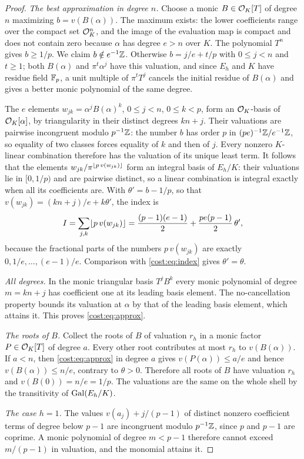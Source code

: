 \begin{proof}
\emph{The best approximation in degree $n$.} Choose a monic $B\in\mathcal{O}_K[T]$ of degree $n$
maximizing $b=v(B(\alpha))$. The maximum exists: the lower coefficients range over the
compact set $\mathcal{O}_K^n$, and the image of the evaluation map is compact and does not contain
zero because $\alpha$ has degree $e>n$ over $K$. The polynomial $T^n$ gives $b\ge1/p$. We
claim $b\notin e^{-1}\mathbb{Z}$. Otherwise $b=j/e+t/p$ with $0\le j<n$ and $t\ge1$; both
$B(\alpha)$ and $\pi^t\alpha^j$ have this valuation, and since $E_h$ and $K$ have residue
field $\mathbb{F}_p$, a unit multiple of $\pi^tT^j$ cancels the initial residue of $B(\alpha)$ and
gives a better monic polynomial of the same degree.

The $e$ elements $w_{jk}=\alpha^jB(\alpha)^k$, $0\le j<n$, $0\le k<p$, form an
$\mathcal{O}_K$-basis of $\mathcal{O}_K[\alpha]$, by triangularity in their distinct degrees $kn+j$. Their
valuations are pairwise incongruent modulo $p^{-1}\mathbb{Z}$: the number $b$ has order $p$ in
$(pe)^{-1}\mathbb{Z}/e^{-1}\mathbb{Z}$, so equality of two classes forces equality of $k$ and then of $j$.
Every nonzero $K$-linear combination therefore has the valuation of its unique least term.
It follows that the elements $w_{jk}/\pi^{\lfloor p\,v(w_{jk})\rfloor}$ form an integral basis of
$E_h/K$: their valuations lie in $[0,1/p)$ and are pairwise distinct, so a linear
combination is integral exactly when all its coefficients are. With $\theta'=b-1/p$, so
that $v(w_{jk})=(kn+j)/e+k\theta'$, the index is
\[
 I=\sum_{j,k}\lfloor p\,v(w_{jk})\rfloor=\frac{(p-1)(e-1)}2+\frac{pe(p-1)}2\,\theta',
\]
because the fractional parts of the numbers $p\,v(w_{jk})$ are exactly
$0,1/e,\ldots,(e-1)/e$. Comparison with \eqref{cost:eq:index} gives $\theta'=\theta$.

\emph{All degrees.} In the monic triangular basis $T^jB^k$ every monic polynomial of degree
$m=kn+j$ has coefficient one at its leading basis element. The no-cancellation property
bounds its valuation at $\alpha$ by that of the leading basis element, which attains it.
This proves \eqref{cost:eq:approx}.

\emph{The roots of $B$.} Collect the roots of $B$ of valuation $r_h$ in a monic factor
$P\in\mathcal{O}_K[T]$ of degree $a$. Every other root contributes at most $r_h$ to $v(B(\alpha))$.
If $a<n$, then \eqref{cost:eq:approx} in degree $a$ gives $v(P(\alpha))\le a/e$ and hence
$v(B(\alpha))\le n/e$, contrary to $\theta>0$. Therefore all roots of $B$ have valuation
$r_h$ and $v(B(0))=n/e=1/p$. The valuations are the same on the whole shell by the
transitivity of $\operatorname{Gal}(E_h/K)$.

\emph{The case $h=1$.} The values $v(a_j)+j/(p-1)$ of distinct nonzero coefficient terms of
degree below $p-1$ are incongruent modulo $p^{-1}\mathbb{Z}$, since $p$ and $p-1$ are coprime.
A monic polynomial of degree $m<p-1$ therefore cannot exceed $m/(p-1)$ in valuation, and
the monomial attains it.
\end{proof}

